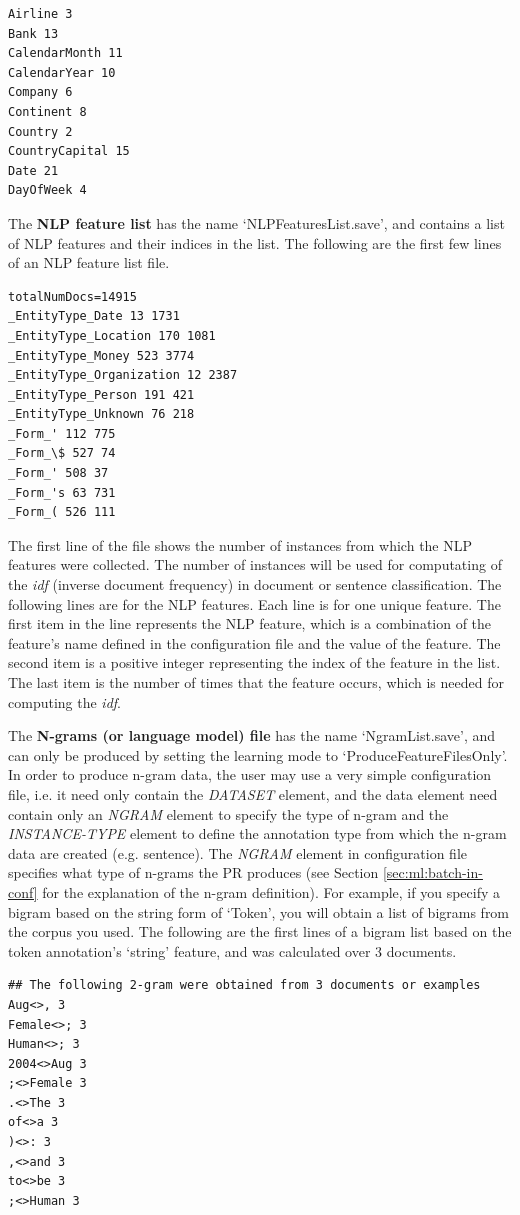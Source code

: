 \begin{small}\begin{verbatim}
Airline 3
Bank 13
CalendarMonth 11
CalendarYear 10
Company 6
Continent 8
Country 2
CountryCapital 15
Date 21
DayOfWeek 4
\end{verbatim}\end{small}

The {\bf NLP feature list} has the name `NLPFeaturesList.save', and contains
a list of NLP features and their indices in the list. The following are the
first few lines of an NLP feature list file.

\begin{small}\begin{verbatim}
totalNumDocs=14915
_EntityType_Date 13 1731
_EntityType_Location 170 1081
_EntityType_Money 523 3774
_EntityType_Organization 12 2387
_EntityType_Person 191 421
_EntityType_Unknown 76 218
_Form_' 112 775
_Form_\$ 527 74
_Form_' 508 37
_Form_'s 63 731
_Form_( 526 111
\end{verbatim}\end{small}

The first line of the file shows the number of instances from which the NLP
features were collected. The number of instances will be used for computating of
the {\em idf} (inverse document frequency) in document or sentence
classification. The following lines are for the NLP features. Each line is for
one unique feature.  The first item in the line represents the NLP feature, which
is a combination of the feature's name defined in the configuration file and the
value of the feature. The second item is a positive integer representing the
index of the feature in the list. The last item is the number of times that the
feature occurs, which is needed for computing the {\em idf}.

The {\bf N-grams (or language model) file} has the name `NgramList.save', and
can only be produced by setting the learning mode to `ProduceFeatureFilesOnly'.
In order to produce n-gram data, the user may use a very simple configuration
file, i.e. it need only contain the {\em DATASET} element, and the data element
need contain only an {\em NGRAM} element to specify the type of n-gram and the
{\em INSTANCE-TYPE} element to define the annotation type from which the n-gram
data are created (e.g. sentence). The {\em NGRAM} element in configuration file
specifies what type of n-grams the PR produces (see Section
\ref{sec:ml:batch-in-conf} for the explanation of the n-gram definition). For
example, if you specify a bigram based on the string form of `Token', you will
obtain a list of bigrams from the corpus you used. The following are the first
lines of a bigram list based on the token annotation's `string' feature, and
was calculated over 3 documents.
\begin{small}\begin{verbatim}
## The following 2-gram were obtained from 3 documents or examples
Aug<>, 3
Female<>; 3
Human<>; 3
2004<>Aug 3
;<>Female 3
.<>The 3
of<>a 3
)<>: 3
,<>and 3
to<>be 3
;<>Human 3
\end{verbatim}\end{small}


